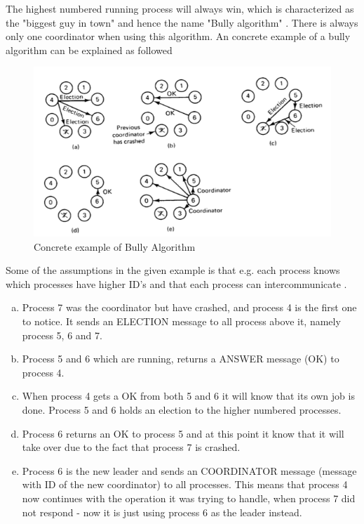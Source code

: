 \documentclass[Main]{subfiles}
\begin{document}
The highest numbered running process will always win, which is characterized as the "biggest guy in town" and hence the name "Bully algorithm" \cite{ElectionAlgorithm}. There is always only one coordinator when using this algorithm. An concrete example of a bully algorithm can be explained as followed

\begin{figure}[H]
\centering
\includegraphics[scale=0.8]{Figurer/BullyAlgorithm.png}
\caption{Concrete example of Bully Algorithm}
\end{figure}

Some of the assumptions in the given example is that e.g. each process knows which processes have higher ID's and that each process can intercommunicate \cite{RMI-slides}. 

\begin{enumerate}[a)]
\item Process 7 was the coordinator but have crashed, and process 4 is the first one to notice. It sends an ELECTION message to all process above it, namely process 5, 6 and 7.  
\item Process 5 and 6 which are running, returns a ANSWER message (OK) to process 4. 
\item When process 4 gets a OK from both 5 and 6 it will know that its own job is done. Process 5 and 6 holds an election to the higher numbered processes. 
\item Process 6 returns an OK to process 5 and at this point it know that it will take over due to the fact that process 7 is crashed. 
\item Process 6 is the new leader and sends an COORDINATOR message (message with ID of the new coordinator) to all processes. This means that process 4 now continues with the operation it was trying to handle, when process 7 did not respond - now it is just using process 6 as the leader instead.
\end{enumerate}
\end{document}
